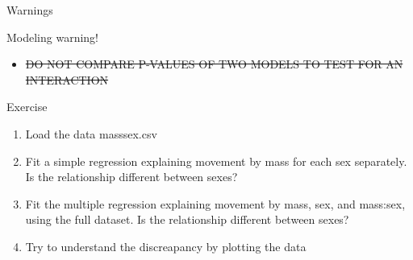 \documentclass[10pt]{beamer}\usepackage[]{graphicx}\usepackage[]{color}
\begin{document}
\begin{frame}[fragile]{Warnings}
  \begin{alertblock}{Modeling warning!}
    \begin{itemize}
      \item \sout{DO NOT COMPARE P-VALUES OF TWO MODELS TO TEST FOR AN INTERACTION}
    \end{itemize}
  \end{alertblock}





  \begin{exampleblock}{Exercise}
    \begin{enumerate}
      \item Load the data masssex.csv
      \item Fit a simple regression explaining movement by mass for each sex separately. Is the relationship different between sexes?
      \item Fit the multiple regression explaining movement by mass, sex, and mass:sex, using the full dataset. Is the relationship different between sexes?
      \item Try to understand the discreapancy by plotting the data
    \end{enumerate}
  \end{exampleblock}

\end{frame}
\end{document}
